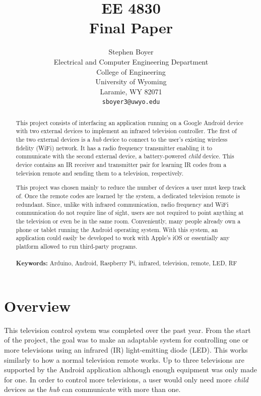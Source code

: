 \documentclass[12pt]{article}
\begin{document}
\title{EE 4830 \\
Final Paper \\}

\author{Stephen Boyer \\
Electrical and Computer Engineering Department \\
College of Engineering \\
University of Wyoming \\
Laramie, WY 82071 \\
\texttt{sboyer3@uwyo.edu}}
\date{}
\maketitle

\begin{abstract}
This project consists of interfacing an application running on a Google Android device with two external devices to implement an infrared television controller. The first of the two external devices is a \emph{hub} device to connect to the user's existing wireless fidelity (WiFi) network. It has a radio frequency transmitter enabling it to communicate with the second external device, a battery-powered \emph{child} device. This device contains an IR receiver and transmitter pair for learning IR codes from a television remote and sending them to a television, respectively.

This project was chosen mainly to reduce the number of devices a user must keep track of. Once the remote codes are learned by the system, a dedicated television remote is redundant. Since, unlike with infrared communication, radio frequency and WiFi communication do not require line of sight, users are not required to point anything at the television or even be in the same room. Conveniently, many people already own a phone or tablet running the Android operating system. With this system, an application could easily be developed to work with Apple's iOS or essentially any platform allowed to run third-party programs.  
\\
\\
\noindent \textbf{Keywords:} Arduino, Android, Raspberry Pi, infrared, television, remote, LED, RF
\end{abstract}

\section*{Overview}
This television control system was completed over the past year. From the start of the project, the goal was to make an adaptable system for controlling one or more televisions using an infrared (IR) light-emitting diode (LED). This works similarly to how a normal television remote works. Up to three televisions are supported by the Android application although enough equipment was only made for one. In order to control more televisions, a user would only need more \emph{child} devices as the \emph{hub} can communicate with more than one. 
\end{document}
